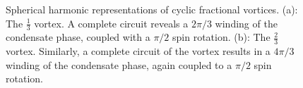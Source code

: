 \begin{figure}
    \centering
    \caption[Spherical harmonic representation of cyclic fractional vortices]
    {\label{fig: cyclic-fractional-spherical}Spherical harmonic
        representations of cyclic fractional vortices.
        (a): The \(\frac{1}{3}\) vortex. A complete circuit reveals a \(2\pi/3\)
        winding of the condensate phase, coupled with a \(\pi/2\) spin rotation.
        (b): The \(\frac{2}{3}\) vortex. Similarly, a complete circuit of the
        vortex results in a \(4\pi/3\) winding of the condensate phase, again
        coupled to a \(\pi/2\) spin rotation.}
\end{figure}
